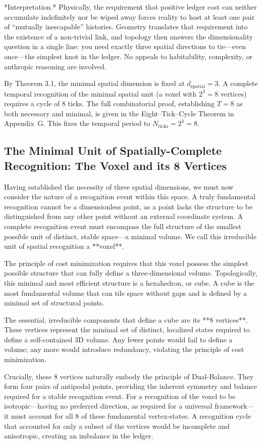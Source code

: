 *Interpretation.*  Physically, the requirement that positive ledger cost can neither accumulate indefinitely nor be wiped away forces reality to host at least one pair of “mutually inescapable” histories.  Geometry translates that requirement into the existence of a non‑trivial link, and topology then answers the dimensionality question in a single line: you need exactly three spatial directions to tie—even once—the simplest knot in the ledger.  No appeals to habitability, complexity, or anthropic reasoning are involved.

By Theorem 3.1, the minimal spatial dimension is fixed at \(d_{\text{spatial}}=3\). A complete temporal recognition of the minimal spatial unit (a voxel with $2^3=8$ vertices) requires a cycle of 8 ticks. The full combinatorial proof, establishing $T=8$ as both necessary and minimal, is given in the Eight–Tick–Cycle Theorem in Appendix~G. This fixes the temporal period to \(N_{\text{ticks}}=2^{3}=8\).

\subsection{The Minimal Unit of Spatially-Complete Recognition: The Voxel and its 8 Vertices}
Having established the necessity of three spatial dimensions, we must now consider the nature of a recognition event within this space. A truly fundamental recognition cannot be a dimensionless point, as a point lacks the structure to be distinguished from any other point without an external coordinate system. A complete recognition event must encompass the full structure of the smallest possible unit of distinct, stable space—a minimal volume. We call this irreducible unit of spatial recognition a **voxel**.

The principle of cost minimization requires that this voxel possess the simplest possible structure that can fully define a three-dimensional volume. Topologically, this minimal and most efficient structure is a hexahedron, or cube. A cube is the most fundamental volume that can tile space without gaps and is defined by a minimal set of structural points.

The essential, irreducible components that define a cube are its **8 vertices**. These vertices represent the minimal set of distinct, localized states required to define a self-contained 3D volume. Any fewer points would fail to define a volume; any more would introduce redundancy, violating the principle of cost minimization.

Crucially, these 8 vertices naturally embody the principle of Dual-Balance. They form four pairs of antipodal points, providing the inherent symmetry and balance required for a stable recognition event. For a recognition of the voxel to be isotropic—having no preferred direction, as required for a universal framework—it must account for all 8 of these fundamental vertex-states. A recognition cycle that accounted for only a subset of the vertices would be incomplete and anisotropic, creating an imbalance in the ledger.

